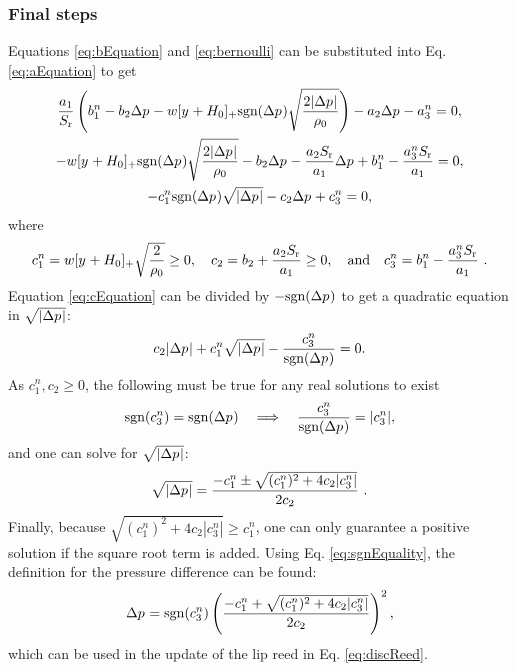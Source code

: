 \subsubsection{Final steps}
Equations \eqref{eq:bEquation} and \eqref{eq:bernoulli} can be substituted into Eq. \eqref{eq:aEquation} to get
\begin{gather}
    \frac{a_1}{S_\text{r}}\left(b_1^n - b_2\Delta p^{} - w[y^{}+H_0]_+\text{sgn}(\Delta p^{})\sqrt{\frac{2|\Delta p^{}|}{\rho_0}}\right) - a_2 \Delta p^{} - a_3^n = 0,\nonumber\\
    - w[y^{}+H_0]_+\text{sgn}(\Delta p^{})\sqrt{\frac{2|\Delta p^{}|}{\rho_0}} - b_2\Delta p^{} - \frac{a_2S_\text{r}}{a_1} \Delta p^{} + b_1^n - \frac{a_3^nS_\text{r}}{a_1} = 0,\nonumber\\
    -c_1^n\text{sgn}(\Delta p^{})\sqrt{|\Delta p^{}|} - c_2\Delta p^{} + c_3^n = 0,\label{eq:cEquation}
\end{gather}
where
\begin{equation}\label{eq:cCoeffs}
    c_1^n = w[y^{} + H_0]_+\sqrt{\frac{2}{\rho_0}} \geq 0, \quad c_2 = b_2 + \frac{a_2S_\text{r}}{a_1} \geq 0, \quad \text{and}\quad c_3^n = b_1^n - \frac{a_3^nS_\text{r}}{a_1}\ .
\end{equation}
Equation \eqref{eq:cEquation} can be divided by $-\text{sgn}(\Delta p^{})$ to get a quadratic equation in $\sqrt{|\Delta p^{}|}$:
\begin{equation}
    c_2|\Delta p^{}| + c_1^n\sqrt{|\Delta p^{}|} - \frac{c_3^n}{\text{sgn}(\Delta p^{})} = 0.
\end{equation}
As $c_1^n, c_2 \geq 0$, the following must be true for any real solutions to exist
\begin{equation}\label{eq:sgnEquality}
    \text{sgn}(c_3^n) = \text{sgn}(\Delta p^{}) \quad \Longrightarrow \quad \frac{c_3^n}{\text{sgn}(\Delta p^{})} = |c_3^n|,
\end{equation}
and one can solve for $\sqrt{|\Delta p^{}|}$:
\begin{equation}
    \sqrt{|\Delta p^{}|} = \frac{-c_1^n \pm \sqrt{(c^n_1)^2+4c_2|c_3^n|}}{2c_2}\ .
\end{equation}
Finally, because $\sqrt{(c_1^n)^2 + 4c_2|c_3^n|} \geq c_1^n$, one can only guarantee a positive solution if the square root term is added. Using Eq. \eqref{eq:sgnEquality}, the definition for the pressure difference can be found:
\begin{equation}\label{eq:pressureDiff}
    \Delta p^{} = \text{sgn}(c_3^n)\left(\frac{-c_1^n + \sqrt{(c^n_1)^2+4c_2|c_3^n|}}{2c_2}\right)^2,
\end{equation}
which can be used in the update of the lip reed in Eq. \eqref{eq:discReed}. 

